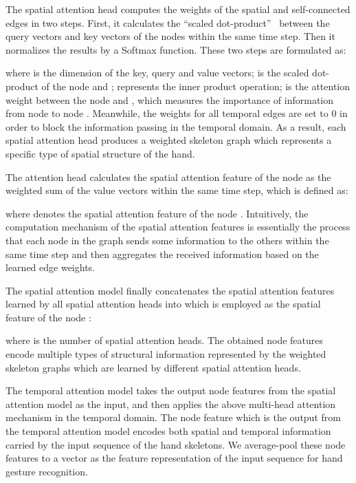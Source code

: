 \documentclass{bmvc2k}
\begin{document}
The spatial attention head computes the weights of the spatial and self-connected edges in two steps. First, it calculates the ``scaled dot-product''~\cite{vaswani2017attention} between the query vectors and key vectors of the nodes within the same time step. Then it normalizes the results by a Softmax function. These two steps are formulated as: 

where  is the dimension of the key, query and value vectors;  is the scaled dot-product of the node  and ;  represents the inner product operation;  is the attention weight between the node  and , which measures the importance of information from node  to node . Meanwhile, the weights for all temporal edges are set to 0 in order to block the information passing in the temporal domain. As a result, each spatial attention head produces a weighted skeleton graph which represents a specific type of spatial structure of the hand. 

The attention head calculates the spatial attention feature of the node  as the weighted sum of the value vectors within the same time step, which is defined as: 

where  denotes the spatial attention feature of the node . Intuitively, the computation mechanism of the spatial attention features is essentially the process that each node in the graph sends some information to the others within the same time step and then aggregates the received information based on the learned edge weights.

The spatial attention model  finally concatenates the spatial attention features learned by all spatial attention heads into  which is employed as the spatial feature of the node :

where  is the number of spatial attention heads. 
The obtained node features encode multiple types of structural information represented by the weighted skeleton graphs which are learned by different spatial attention heads. 

The temporal attention model  takes the output node features from the spatial attention model as the input, and then applies the above multi-head attention mechanism in the temporal domain. The node feature which is the output from the temporal attention model encodes both spatial and temporal information carried by the input sequence of the hand skeletons. We average-pool these node features to a vector as the feature representation of the input sequence for hand gesture recognition.
\end{document}
